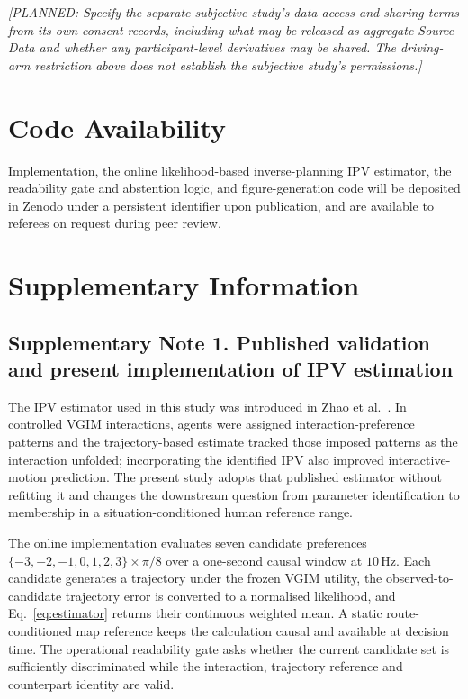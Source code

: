 \documentclass[12pt,a4paper]{article}
\newcommand{\planned}[1]{{\color{blue!60!black}\textit{[PLANNED: #1]}}}
\begin{document}
\planned{Specify the separate subjective study's data-access and sharing terms from its own
consent records, including what may be released as aggregate Source Data and whether any
participant-level derivatives may be shared. The driving-arm restriction above does not establish
the subjective study's permissions.}

\section*{Code Availability}
Implementation, the online likelihood-based inverse-planning IPV estimator, the readability gate and
abstention logic, and figure-generation code will be deposited in Zenodo under a persistent
identifier upon publication, and are available to referees on request during peer review.


\clearpage
\section*{Supplementary Information}
\setcounter{figure}{0}
\renewcommand{\thefigure}{S\arabic{figure}}
\setcounter{table}{0}
\renewcommand{\thetable}{S\arabic{table}}

\subsection*{Supplementary Note 1. Published validation and present implementation of IPV estimation}
The IPV estimator used in this study was introduced in Zhao et al.~\cite{zhao2024measuring}. In
controlled VGIM interactions, agents were assigned interaction-preference patterns and the
trajectory-based estimate tracked those imposed patterns as the interaction unfolded; incorporating
the identified IPV also improved interactive-motion prediction. The present study adopts that
published estimator without refitting it and changes the downstream question from parameter
identification to membership in a situation-conditioned human reference range.

The online implementation evaluates seven candidate preferences
$\{-3,-2,-1,0,1,2,3\}\times\pi/8$ over a one-second causal window at $10$\,Hz. Each candidate
generates a trajectory under the frozen VGIM utility, the observed-to-candidate trajectory error is
converted to a normalised likelihood, and Eq.~\ref{eq:estimator} returns their continuous weighted
mean. A static route-conditioned map reference keeps the calculation causal and available at decision
time. The operational readability gate asks whether the current candidate set is sufficiently
discriminated while the interaction, trajectory reference and counterpart identity are valid.
\end{document}
